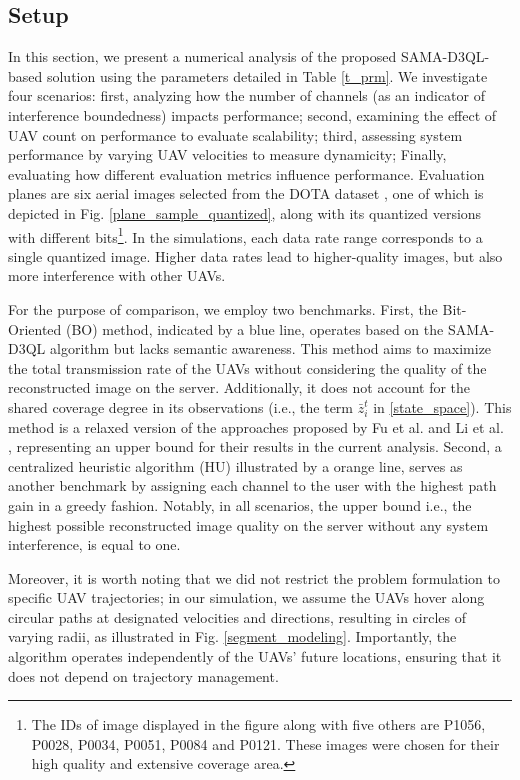 \documentclass[conference]{IEEEtran}
\begin{document}
\subsection{Setup}
In this section, we present a numerical analysis of the proposed SAMA-D3QL-based solution using the parameters detailed in Table \ref{t_prm}. We investigate four scenarios: first, analyzing how the number of channels (as an indicator of interference boundedness) impacts performance; second, examining the effect of UAV count on performance to evaluate scalability; third, assessing system performance by varying UAV velocities to measure dynamicity; Finally, evaluating how different evaluation metrics influence performance. Evaluation planes are six aerial images selected from the DOTA dataset \cite{xia2018dota}, one of which is depicted in Fig. \ref{plane_sample_quantized}, along with its quantized versions with different bits\footnote{The IDs of image displayed in the figure along with five others are P1056, P0028, P0034, P0051, P0084 and P0121. These images were chosen for their high quality and extensive coverage area.}. In the simulations, each data rate range corresponds to a single quantized image. Higher data rates lead to higher-quality images, but also more interference with other UAVs.

For the purpose of comparison, we employ two benchmarks. First, the Bit-Oriented (BO) method, indicated by a blue line, operates based on the SAMA-D3QL algorithm but lacks semantic awareness. This method aims to maximize the total transmission rate of the UAVs without considering the quality of the reconstructed image on the server. Additionally, it does not account for the shared coverage degree in its observations (i.e., the term \(\bar{z}_{i}^{t}\) in \eqref{state_space}). This method is a relaxed version of the approaches proposed by Fu et al. \cite{fu2023uav} and Li et al. \cite{li2024blocklength}, representing an upper bound for their results in the current analysis. Second, a centralized heuristic algorithm (HU) illustrated by a orange line, serves as another benchmark by assigning each channel to the user with the highest path gain in a greedy fashion. Notably, in all scenarios, the upper bound i.e., the highest possible reconstructed image quality on the server without any system interference, is equal to one.

Moreover, it is worth noting that we did not restrict the problem formulation to specific UAV trajectories; in our simulation, we assume the UAVs hover along circular paths at designated velocities and directions, resulting in circles of varying radii, as illustrated in Fig. \ref{segment_modeling}. Importantly, the algorithm operates independently of the UAVs' future locations, ensuring that it does not depend on trajectory management.
\end{document}
